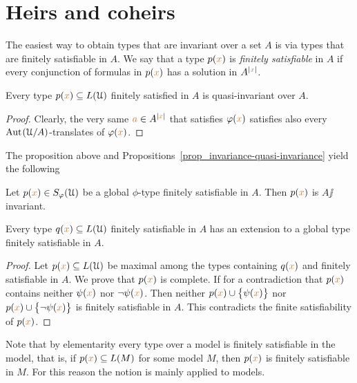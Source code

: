 \documentclass[creche.tex]{subfiles}
\begin{document}
\section{Heirs and coheirs}

The easiest way to obtain types that are invariant over a set $A$ is via types that are finitely satisfiable in $A$.
We say that a type $p({\color{brown} x})$ is  \emph{finitely satisfiable\/} in $A$ if every conjunction of formulas in $p({\color{brown} x})$ has a solution in $A^{|{\color{brown} x}|}$.

\begin{proposition}\label{prop_coeredi_quasiinvarienti}
Every type $p({\color{brown} x})\subseteq L(\EuScript U)$ finitely satisfied in $A$ is quasi-invariant over $A$.

\end{proposition}

\begin{proof}
Clearly, the very same ${\color{brown} a}\in A^{|{\color{brown} x}|}$ that satisfies $\varphi({\color{brown} x})$ satisfies also every $\textrm{Aut\kern.15ex}(\EuScript U/A)$-translates of $\varphi({\color{brown} x})$.
\end{proof}

The proposition above and Propositions~\ref{prop_invariance-quasi-invariance} yield the following

\begin{proposition}\label{prop_coeredi_invarienti}
Let $p({\color{brown} x})\in S_{\varphi}(\EuScript U)$ be a global $\phi$-type finitely satisfiable in $A$.
Then $p({\color{brown} x})$ is $A\jj$in\-vari\-ant.\QED
\end{proposition}

\begin{proposition}\label{prop_exisntence_coheirs}
Every type $q({\color{brown} x})\subseteq L(\EuScript U)$ finitely satisfiable in $A$ has an extension to a global type finitely satisfiable in $A$.
\end{proposition}

\begin{proof} 
Let $p({\color{brown} x})\subseteq L(\EuScript U)$ be maximal among the types containing $q({\color{brown} x})$ and finitely satisfiable in $A$.
We prove that $p({\color{brown} x})$ is complete.
If for a contradiction that $p({\color{brown} x})$ contains neither $\psi({\color{brown} x})$ nor $\neg\psi({\color{brown} x})$.
Then  neither $p({\color{brown} x})\cup\big\{\psi({\color{brown} x})\big\}$ nor $p({\color{brown} x})\cup\big\{\neg\psi({\color{brown} x})\big\}$ is finitely satisfiable in $A$.
This contradicts the finite satisfiability of $p({\color{brown} x})$.
\end{proof}

Note that by elementarity every type over a model is finitely satisfiable in the model, that is, if $p({\color{brown} x})\subseteq L(M)$ for some model $M$, then $p({\color{brown} x})$ is finitely satisfiable in $M$.
For this reason the notion is mainly applied to models.
\end{document}
